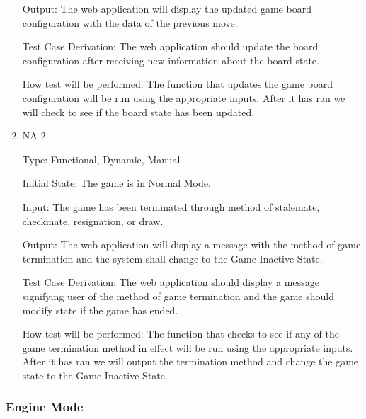 \documentclass[12pt, titlepage]{article}
\begin{document}
\begin{enumerate}
      Output: The web application will display the updated game board configuration with the data
      of the previous move.
                          
      Test Case Derivation: The web application should update the board configuration after receiving new information about the board state. 
  
      How test will be performed: The function that updates the game board configuration
      will be run using the appropriate inputs. After it has ran we will check to see if the board state has been updated.
  
      \item{NA-2\\}
  
      Type: Functional, Dynamic, Manual
                        
      Initial State: The game is in Normal Mode.
                          
      Input: The game has been terminated through method of stalemate, checkmate, resignation, or draw.
                          
      Output: The web application will display a message with the method of game termination and the
      system shall change to the Game Inactive State.
                          
      Test Case Derivation: The web application should display a message signifying user of the method of game termination
      and the game should modify state if the game has ended.
  
      How test will be performed: The function that checks to see if any of the game termination method in effect
      will be run using the appropriate inputs. After it has ran we will output the termination method and change the
      game state to the Game Inactive State.
  
    \end{enumerate}
  
    \subsubsection{Engine Mode}
  
\end{document}
